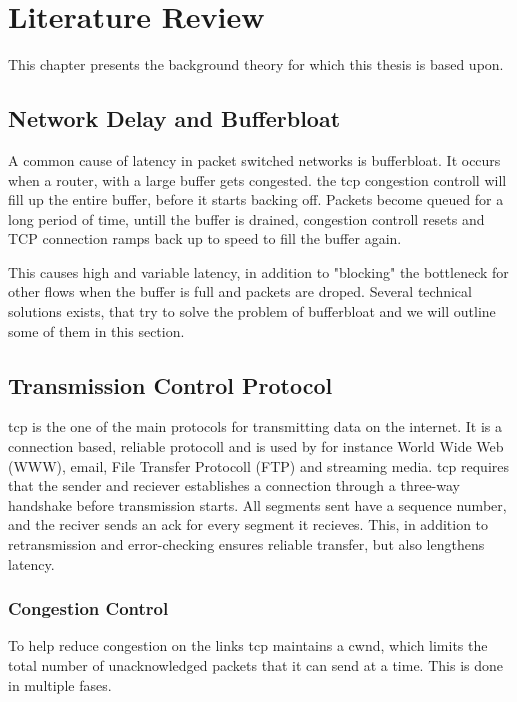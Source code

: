 \chapter{Literature Review}

This chapter presents the background theory for which this thesis is based upon.


\section{Network Delay and Bufferbloat}

A common cause of latency in packet switched networks is bufferbloat. It occurs when a router, with a large buffer gets congested. the tcp congestion controll will fill up the entire buffer, before it starts backing off. Packets become queued for a long period of time, untill the buffer is drained, congestion controll resets and TCP connection ramps back up to speed to fill the buffer again.

This causes high and variable latency, in addition to "blocking" the bottleneck for other flows when the buffer is full and packets are droped. Several technical solutions exists, that try to solve the problem of bufferbloat and we will outline some of them  in this section.

\section{Transmission Control Protocol}

\gls{tcp} is the one of the main protocols for transmitting data on the internet. It is a connection based, reliable protocoll and is used by for instance World Wide Web (WWW), email, File Transfer Protocoll (FTP) and streaming media. \gls{tcp} requires that the sender and reciever establishes a connection through a three-way handshake before transmission starts. All segments sent have a sequence number, and the reciver sends an \gls{ack} for every segment it recieves. This, in addition to retransmission and error-checking ensures reliable transfer, but also lengthens latency.

\subsection{Congestion Control}
To help reduce congestion on the links \gls{tcp} maintains a \gls{cwnd}, which limits the total number of unacknowledged packets that it can send at a time. This is  done in multiple fases.

